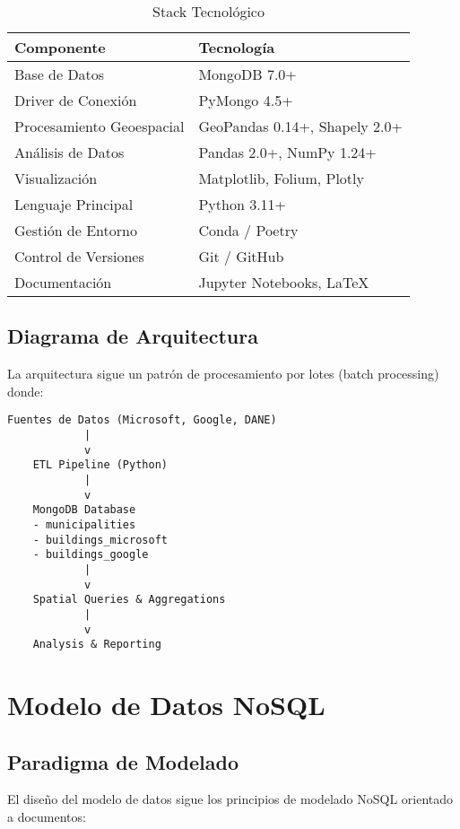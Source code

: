 \documentclass[12pt,a4paper]{article}
\begin{document}
\begin{table}[h]
\centering
\caption{Stack Tecnológico}
\begin{tabular}{@{}ll@{}}
\toprule
\textbf{Componente} & \textbf{Tecnología} \\ \midrule
Base de Datos & MongoDB 7.0+ \\
Driver de Conexión & PyMongo 4.5+ \\
Procesamiento Geoespacial & GeoPandas 0.14+, Shapely 2.0+ \\
Análisis de Datos & Pandas 2.0+, NumPy 1.24+ \\
Visualización & Matplotlib, Folium, Plotly \\
Lenguaje Principal & Python 3.11+ \\
Gestión de Entorno & Conda / Poetry \\
Control de Versiones & Git / GitHub \\
Documentación & Jupyter Notebooks, LaTeX \\ \bottomrule
\end{tabular}
\end{table}

\subsection{Diagrama de Arquitectura}

La arquitectura sigue un patrón de procesamiento por lotes (batch processing) donde:

\begin{verbatim}
Fuentes de Datos (Microsoft, Google, DANE)
            |
            v
    ETL Pipeline (Python)
            |
            v
    MongoDB Database
    - municipalities
    - buildings_microsoft
    - buildings_google
            |
            v
    Spatial Queries & Aggregations
            |
            v
    Analysis & Reporting
\end{verbatim}

\newpage
\section{Modelo de Datos NoSQL}

\subsection{Paradigma de Modelado}

El diseño del modelo de datos sigue los principios de modelado NoSQL orientado a documentos:
\end{document}
